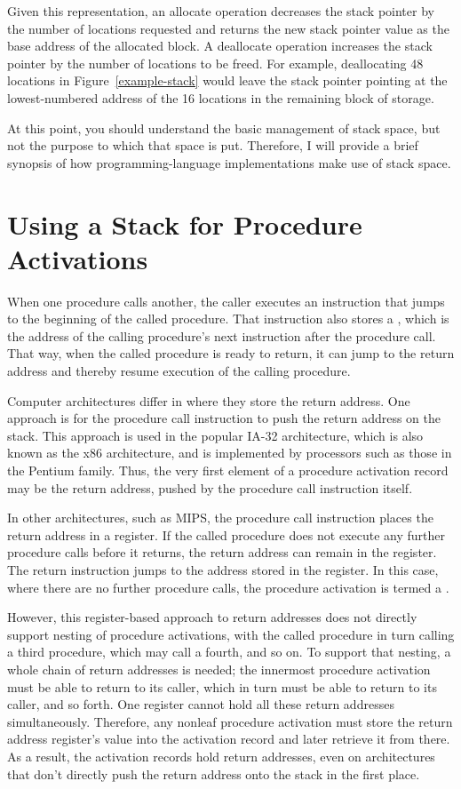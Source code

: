 Given this representation, an allocate operation decreases the stack
pointer by the number of locations requested and returns the new
stack pointer value as the base address of the allocated block.  A
deallocate operation increases the stack pointer by the number of
locations to be freed.  For example, deallocating 48 locations in
Figure~\ref{example-stack} would leave the stack pointer pointing at the
lowest-numbered address of the 16 locations in the remaining block of
storage.

At this point, you should understand the basic management of stack
space, but not the purpose to which that space is put.  Therefore, I
will provide a brief synopsis of how programming-language
implementations make use of stack space.

\section{Using a Stack for Procedure Activations}\label{stacks-application-section}

When one procedure calls another, the caller executes an instruction that
jumps to the beginning of the called procedure.  That instruction also
stores a , which is the address of the calling
procedure's next instruction after the procedure call.  That way,
when the called procedure is ready to return, it can jump to the
return address and thereby resume execution of the calling procedure.

Computer architectures differ in where they store the return address.
One approach is for the procedure call instruction to push the return
address on the stack.  This approach is used in the popular IA-32
architecture, which is also known as the x86 architecture, and is
implemented by processors such as those in the Pentium family.  Thus, the very
first element of a procedure activation record may be the return
address, pushed by the procedure call instruction itself.

In other architectures, such as MIPS, the procedure call
instruction places the return address in a register.  If the called
procedure does not execute any further procedure calls before it
returns, the return address can remain in the register.  The return
instruction jumps to the address stored in the register.  In this
case, where there are no further procedure calls, the procedure
activation is termed a .

However, this register-based approach to return addresses does not
directly support nesting of procedure activations, with the called
procedure in turn calling a third procedure, which may call a fourth,
and so on.  To support that nesting, a whole chain of return addresses
is needed; the innermost procedure activation must be able to return
to its caller, which in turn must be able to return to its caller, and
so forth.  One register cannot hold all these return addresses
simultaneously.  Therefore, any nonleaf procedure activation must
store the return address register's value into the activation record
and later retrieve it from there.  As a result, the activation records
hold return addresses, even on architectures that don't directly push
the return address onto the stack in the first place.

